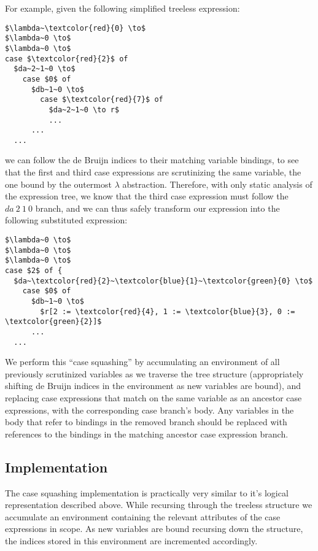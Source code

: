 For example, given the following simplified treeless expression:

\begin{lstlisting}[style=math]
$\lambda~\textcolor{red}{0} \to$
$\lambda~0 \to$
$\lambda~0 \to$
case $\textcolor{red}{2}$ of
  $da~2~1~0 \to$
    case $0$ of
      $db~1~0 \to$
        case $\textcolor{red}{7}$ of
          $da~2~1~0 \to r$
          ...
      ...
  ...
\end{lstlisting}

we can follow the de Bruijn indices to their matching variable bindings, to see that the first and third case expressions are scrutinizing the same variable, the one bound by the outermost $\lambda$ abstraction. Therefore, with only static analysis of the expression tree, we know that the third case expression must follow the $da~2~1~0$ branch, and we can thus safely transform our expression into the following substituted expression:

\begin{lstlisting}[style=math]
$\lambda~0 \to$
$\lambda~0 \to$
$\lambda~0 \to$
case $2$ of {
  $da~\textcolor{red}{2}~\textcolor{blue}{1}~\textcolor{green}{0} \to$
    case $0$ of
      $db~1~0 \to$
        $r[2 := \textcolor{red}{4}, 1 := \textcolor{blue}{3}, 0 := \textcolor{green}{2}]$
      ...
  ...
\end{lstlisting}

We perform this ``case squashing'' by accumulating an environment of all previously scrutinized variables as we traverse the tree structure (appropriately shifting de Bruijn indices in the environment as new variables are bound), and replacing case expressions that match on the same variable as an ancestor case expressions, with the corresponding case branch's body. Any variables in the body that refer to bindings in the removed branch should be replaced with references to the bindings in the matching ancestor case expression branch.

\subsection{Implementation}

The case squashing implementation is practically very similar to it's logical representation described above. While recursing through the treeless structure we accumulate an environment containing the relevant attributes of the case expressions in scope. As new variables are bound recursing down the structure, the indices stored in this environment are incremented accordingly.

